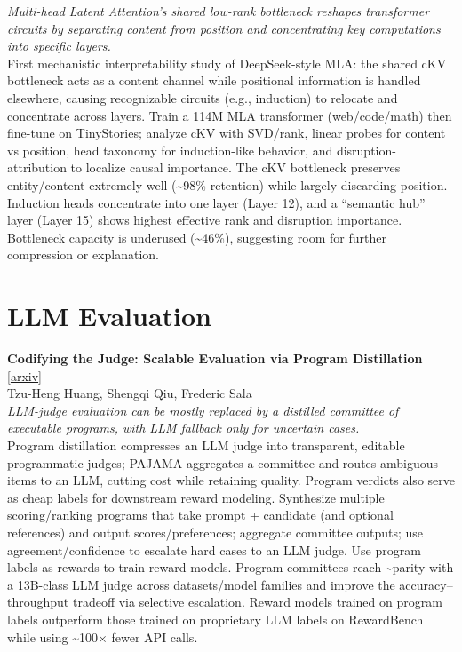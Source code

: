 \documentclass[12pt,letterpaper]{article}
\begin{document}
{\small\textit{Multi-head Latent Attention's shared low-rank bottleneck reshapes transformer circuits by separating content from position and concentrating key computations into specific layers.}}\\[1pt]
{\footnotesize First mechanistic interpretability study of DeepSeek-style MLA: the shared cKV bottleneck acts as a content channel while positional information is handled elsewhere, causing recognizable circuits (e.g., induction) to relocate and concentrate across layers. Train a 114M MLA transformer (web/code/math) then fine-tune on TinyStories; analyze cKV with SVD/rank, linear probes for content vs position, head taxonomy for induction-like behavior, and disruption-attribution to localize causal importance. The cKV bottleneck preserves entity/content extremely well (\textasciitilde{}98\% retention) while largely discarding position. Induction heads concentrate into one layer (Layer 12), and a ``semantic hub'' layer (Layer 15) shows highest effective rank and disruption importance. Bottleneck capacity is underused (\textasciitilde{}46\%), suggesting room for further compression or explanation.}

\medskip


\section*{LLM Evaluation}

{\small\textbf{Codifying the Judge: Scalable Evaluation via Program Distillation}} {\scriptsize[\href{https://arxiv.org/abs/2607.22561}{arxiv}]}\\
{\scriptsize Tzu-Heng Huang, Shengqi Qiu, Frederic Sala}\\

{\small\textit{LLM-judge evaluation can be mostly replaced by a distilled committee of executable programs, with LLM fallback only for uncertain cases.}}\\[1pt]
{\footnotesize Program distillation compresses an LLM judge into transparent, editable programmatic judges; PAJAMA aggregates a committee and routes ambiguous items to an LLM, cutting cost while retaining quality. Program verdicts also serve as cheap labels for downstream reward modeling. Synthesize multiple scoring/ranking programs that take prompt + candidate (and optional references) and output scores/preferences; aggregate committee outputs; use agreement/confidence to escalate hard cases to an LLM judge. Use program labels as rewards to train reward models. Program committees reach \textasciitilde{}parity with a 13B-class LLM judge across datasets/model families and improve the accuracy--throughput tradeoff via selective escalation. Reward models trained on program labels outperform those trained on proprietary LLM labels on RewardBench while using \textasciitilde{}100× fewer API calls.}
\end{document}
